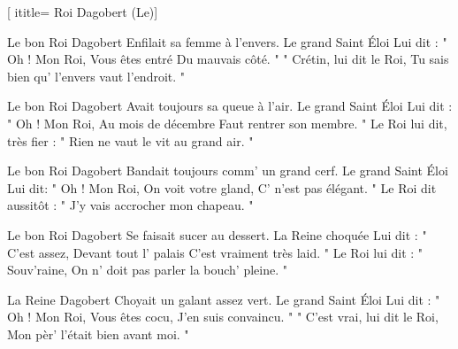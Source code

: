  [
ititle= {Roi Dagobert (Le)}]


\beginverse
Le bon Roi Dagobert
Enfilait sa femme à l'envers.
Le grand Saint Éloi
Lui dit : " Oh ! Mon Roi,
Vous êtes entré
Du mauvais côté. "
" Crétin, lui dit le Roi,
Tu sais bien qu' l'envers vaut l'endroit. "
\endverse

\beginverse
Le bon Roi Dagobert
Avait toujours sa queue à l'air.
Le grand Saint Éloi
Lui dit : " Oh ! Mon Roi,
Au mois de décembre
Faut rentrer son membre. "
Le Roi lui dit, très fier :
" Rien ne vaut le vit au grand air. "
\endverse

\beginverse
Le bon Roi Dagobert
Bandait toujours comm' un grand cerf.
Le grand Saint Éloi
Lui dit: " Oh ! Mon Roi,
On voit votre gland,
C' n'est pas élégant. "
Le Roi dit aussitôt :
" J'y vais accrocher mon chapeau. "
\endverse

\beginverse
Le bon Roi Dagobert
Se faisait sucer au dessert.
La Reine choquée
Lui dit : " C'est assez,
Devant tout l' palais
C'est vraiment très laid. "
Le Roi lui dit : " Souv'raine,
On n' doit pas parler la bouch' pleine. "
\endverse

\beginverse
La Reine Dagobert
Choyait un galant assez vert.
Le grand Saint Éloi
Lui dit : " Oh ! Mon Roi,
Vous êtes cocu,
J'en suis convaincu. "
" C'est vrai, lui dit le Roi,
Mon pèr' l'était bien avant moi. "
\endverse

\endsong